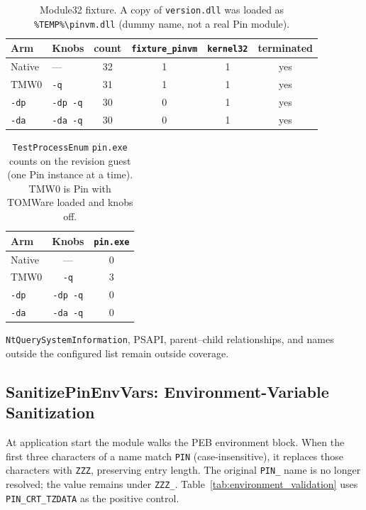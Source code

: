 \documentclass[pdflatex,sn-mathphys-num]{sn-jnl}
\theoremstyle{thmstyleone}
\theoremstyle{thmstyletwo}
\theoremstyle{thmstylethree}
\begin{document}
\begin{table}[t]
\caption{Module32 fixture. A copy of \texttt{version.dll} was loaded as \texttt{\%TEMP\%\textbackslash pinvm.dll} (dummy name, not a real Pin module).}
\label{tab:module32_fixture}
\centering
\small
\begin{tabular}{llcccc}
\toprule
\textbf{Arm} & \textbf{Knobs} & \textbf{count} & \texttt{fixture\_pinvm} & \texttt{kernel32} & \textbf{terminated} \\
\midrule
Native & --- & 32 & 1 & 1 & yes \\
TMW0 & \texttt{-q} & 31 & 1 & 1 & yes \\
\texttt{-dp} & \texttt{-dp -q} & 30 & 0 & 1 & yes \\
\texttt{-da} & \texttt{-da -q} & 30 & 0 & 1 & yes \\
\bottomrule
\end{tabular}
\end{table}

\begin{table}[t]
\caption{\texttt{TestProcessEnum} \texttt{pin.exe} counts on the revision guest (one Pin instance at a time). TMW0 is Pin with TOMWare loaded and knobs off.}
\label{tab:processenum_pin_counts}
\centering
\small
\begin{tabular}{lcc}
\toprule
\textbf{Arm} & \textbf{Knobs} & \texttt{pin.exe} \\
\midrule
Native & --- & 0 \\
TMW0 & \texttt{-q} & 3 \\
\texttt{-dp} & \texttt{-dp -q} & 0 \\
\texttt{-da} & \texttt{-da -q} & 0 \\
\bottomrule
\end{tabular}
\end{table}

\texttt{NtQuerySystemInformation}, PSAPI, parent--child relationships, and names outside the configured list remain outside coverage.

\subsection{SanitizePinEnvVars: Environment-Variable Sanitization}
\label{subsec:environment_sanitization}

At application start the module walks the PEB environment block. When the first three characters of a name match \texttt{PIN} (case-insensitive), it replaces those characters with \texttt{ZZZ}, preserving entry length. The original \texttt{PIN\_} name is no longer resolved; the value remains under \texttt{ZZZ\_}. Table~\ref{tab:environment_validation} uses \texttt{PIN\_CRT\_TZDATA} as the positive control.
\end{document}
